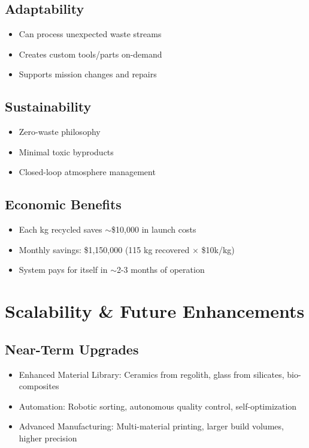 \documentclass[12pt, a4paper]{article}
\begin{document}
\subsection{Adaptability}
\begin{itemize}
    \item Can process unexpected waste streams
    \item Creates custom tools/parts on-demand
    \item Supports mission changes and repairs
\end{itemize}

\subsection{Sustainability}
\begin{itemize}
    \item Zero-waste philosophy
    \item Minimal toxic byproducts
    \item Closed-loop atmosphere management
\end{itemize}

\subsection{Economic Benefits}
\begin{itemize}
    \item Each kg recycled saves $\sim$\$10,000 in launch costs
    \item Monthly savings: \$1,150,000 (115 kg recovered $\times$ \$10k/kg)
    \item System pays for itself in $\sim$2-3 months of operation
\end{itemize}

\section{Scalability \& Future Enhancements}

\subsection{Near-Term Upgrades}
\begin{itemize}
    \item Enhanced Material Library: Ceramics from regolith, glass from silicates, bio-composites
    \item Automation: Robotic sorting, autonomous quality control, self-optimization
    \item Advanced Manufacturing: Multi-material printing, larger build volumes, higher precision
\end{itemize}
\end{document}
